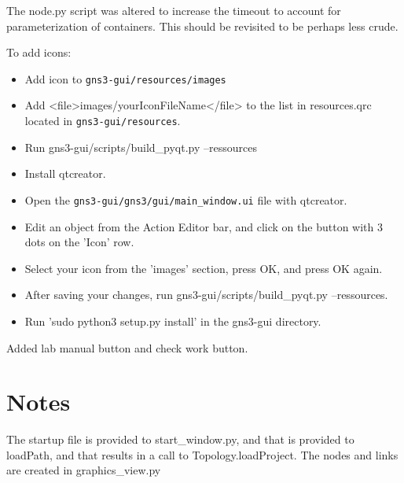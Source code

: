 \documentclass[12pt]{article}
\begin{document}
The node.py script was altered to increase the timeout to account for parameterization of
containers.  This should be revisited to be perhaps less crude.

\bigskip
To add icons: 
\begin{itemize}
	\item Add icon to {\tt gns3-gui/resources/images}
	\item Add  <file>images/yourIconFileName</file> to the list in resources.qrc located in {\tt gns3-gui/resources}.
	\item Run gns3-gui/scripts/build\_pyqt.py --ressources
	\item Install qtcreator. 
	\item Open the {\tt gns3-gui/gns3/gui/main\_window.ui} file with qtcreator.
	\item Edit an object from the Action Editor bar, and click on the button with 3 dots on the 'Icon' row. 
	\item Select your icon from the 'images' section, press OK, and press OK again.
	\item After saving your changes, run gns3-gui/scripts/build\_pyqt.py --ressources.
	\item Run 'sudo python3 setup.py install' in the gns3-gui directory.
\end{itemize}
Added lab manual button and check work button.
\section{Notes}
The startup file is provided to start\_window.py, and that is provided to loadPath, and that results in
a call to Topology.loadProject.  The nodes and links are created in graphics\_view.py
\end{document}
